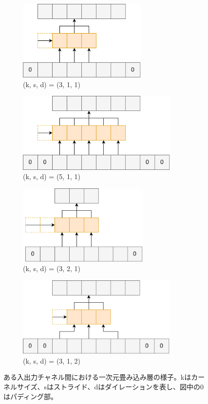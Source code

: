 \documentclass[12pt]{jarticle}
\numberwithin{equation}{section}    %
\numberwithin{figure}{section}      %
\numberwithin{table}{section}      %
\begin{document}
\begin{figure}[tb]
    \centering
    \begin{subfigure}[b]{0.48\textwidth}
        \centering
        \includegraphics[height=4cm]{./figure/sec3/conv1.drawio.png}
        \caption{(k, s, d) = (3, 1, 1)}
        \label{sec3:fig:conv1}
    \end{subfigure}
    \begin{subfigure}[b]{0.48\textwidth}
        \centering
        \includegraphics[height=4cm]{./figure/sec3/conv2.drawio.png}
        \caption{(k, s, d) = (5, 1, 1)}
        \label{sec3:fig:conv2}
    \end{subfigure}

    \vspace{0.5cm}

    \begin{subfigure}[b]{0.48\textwidth}
        \centering
        \includegraphics[height=4cm]{./figure/sec3/conv3.drawio.png}
        \caption{(k, s, d) = (3, 2, 1)}
        \label{sec3:fig:conv3}
    \end{subfigure}
    \begin{subfigure}[b]{0.48\textwidth}
        \centering
        \includegraphics[height=4cm]{./figure/sec3/conv4.drawio.png}
        \caption{(k, s, d) = (3, 1, 2)}
        \label{sec3:fig:conv4}
    \end{subfigure}
    \caption{ある入出力チャネル間における一次元畳み込み層の様子。kはカーネルサイズ、sはストライド、dはダイレーションを表し、図中の0はパディング部。}
    \label{sec3:fig:conv_variations}
\end{figure}
\end{document}
